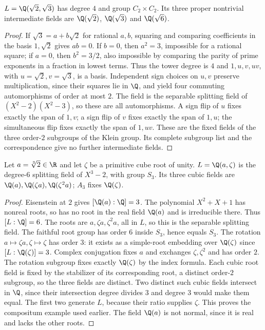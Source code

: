 \begin{example}
$L=\Q(\sqrt2,\sqrt3)$ has degree $4$ and group $C_2\times C_2$. Its three proper nontrivial intermediate fields are $\Q(\sqrt2)$, $\Q(\sqrt3)$ and $\Q(\sqrt6)$.
\end{example}
\begin{proof}
If $\sqrt3=a+b\sqrt2$ for rational $a,b$, squaring and comparing coefficients in the basis $1,\sqrt2$ gives $ab=0$. If $b=0$, then $a^2=3$, impossible for a rational square; if $a=0$, then $b^2=3/2$, also impossible by comparing the parity of prime exponents in a fraction in lowest terms. Thus the tower degree is $4$ and $1,u,v,uv$, with $u=\sqrt2,v=\sqrt3$, is a basis. Independent sign choices on $u,v$ preserve multiplication, since their squares lie in $\Q$, and yield four commuting automorphisms of order at most $2$. The field is the separable splitting field of $(X^2-2)(X^2-3)$, so these are all automorphisms. A sign flip of $u$ fixes exactly the span of $1,v$; a sign flip of $v$ fixes exactly the span of $1,u$; the simultaneous flip fixes exactly the span of $1,uv$. These are the fixed fields of the three order-$2$ subgroups of the Klein group. Its complete subgroup list and the correspondence give no further intermediate fields.
\end{proof}

\begin{example}
Let $a=\sqrt[3]{2}\in\R$ and let $\zeta$ be a primitive cube root of unity. $L=\Q(a,\zeta)$ is the degree-$6$ splitting field of $X^3-2$, with group $S_3$. Its three cubic fields are $\Q(a),\Q(\zeta a),\Q(\zeta^2a)$; $A_3$ fixes $\Q(\zeta)$.
\end{example}
\begin{proof}
Eisenstein at $2$ gives $[\Q(a):\Q]=3$. The polynomial $X^2+X+1$ has nonreal roots, so has no root in the real field $\Q(a)$ and is irreducible there. Thus $[L:\Q]=6$. The roots are $a,\zeta a,\zeta^2a$, all in $L$, so this is the separable splitting field. The faithful root group has order $6$ inside $S_3$, hence equals $S_3$. The rotation $a\mapsto\zeta a,\zeta\mapsto\zeta$ has order $3$: it exists as a simple-root embedding over $\Q(\zeta)$ since $[L:\Q(\zeta)]=3$. Complex conjugation fixes $a$ and exchanges $\zeta,\zeta^2$ and has order $2$. The rotation subgroup fixes exactly $\Q(\zeta)$ by the index formula. Each cubic root field is fixed by the stabilizer of its corresponding root, a distinct order-$2$ subgroup, so the three fields are distinct. Two distinct such cubic fields intersect in $\Q$, since their intersection degree divides $3$ and degree $3$ would make them equal. The first two generate $L$, because their ratio supplies $\zeta$. This proves the compositum example used earlier. The field $\Q(a)$ is not normal, since it is real and lacks the other roots.
\end{proof}


